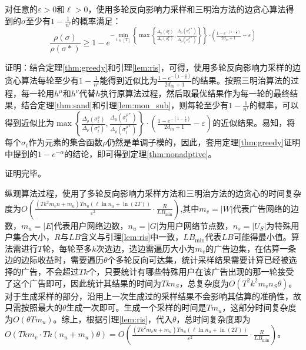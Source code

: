 \begin{theorem}
\label{thm:nonadptive}
对任意的$\varepsilon>0$和$\ell > 0$，使用多轮反向影响力采样和三明治方法的边贪心算法得到的$\sigma$至少有$1-\frac{1}{n^{\ell}}$的概率满足：
\begin{equation}
\frac{\rho(\sigma)}{\rho(\sigma*)} \ge 1-e^{-\min_{t \in [T]}\left\{\max\left\{\frac{\Delta_\rho(\sigma_t^\nu)}{\Delta_\nu(\sigma_t^\nu)},\frac{\Delta_\mu(\sigma_t^{\rho*})}{\Delta_\rho(\sigma_t^{\rho*})} \right\}\right\}\cdot\left(\frac{1-e^{-(1-\frac{1}{k})}}{2d_{in}+1}-\varepsilon\right)}
\end{equation}
\end{theorem}

\noindent 证明：结合定理\ref{thm:greedy}和引理\ref{lem:ris}，可得，使用多轮反向影响力采样的边贪心算法每轮至少有$1-\frac{1}{n^{\ell}}$能得到近似比为$\frac{1-e^{-(1-\frac{1}{k})}}{2d_{in}+1}$的结果。按照三明治算法的过程，每一轮用$h^\mu$和$h^\nu$代替$h$执行原算法过程，然后取最优结果作为每一轮的最终结果，结合定理\ref{thm:sand}和引理\ref{lem:mon_sub}，则每轮至少有$1-\frac{1}{n^{\ell}}$的概率，可以得到近似比为$\max\left\{\frac{\Delta_\rho(\sigma_t^\nu)}{\Delta_\nu(\sigma_t^\nu)},\frac{\Delta_\mu(\sigma_t^{\rho*})}{\Delta_\rho(\sigma_t^{\rho*})} \right\}\cdot\left(\frac{1-e^{-(1-\frac{1}{k})}}{2d_{in}+1}-\varepsilon\right)$的近似结果。易知，将每个$\sigma_t$作为元素的集合函数$\rho$仍然是单调子模的，因此，套用定理\ref{thm:greedy}证明中提到的$1-e^{-\alpha}$的结论，即可得到定理\ref{thm:nonadptive}。

\noindent 证明完毕。

纵观算法过程，使用了多轮反向影响力采样方法和三明治方法的边贪心的时间复杂度为$O\left(\frac{(Tk^2 m_v n + m_u)Tn_u(\ell \ln n_u + \ln (2T))}{\varepsilon^2}\cdot\frac{R}{LB_{\min}}\right)$,其中$m_v=|W|$代表广告网络的边数，$m_u=|E|$代表用户网络边数，$n_u=|G|$为用户网络节点数，$n_s=|U_S|$为特殊用户集合大小，$R$与$LB$含义与引理\ref{lem:ris}中一致，$LB_{\min}$代表$LB$可能得最小值。算法需进行$T$轮，每轮至多$k$次选边，选边需遍历大小为$m_v$的广告边集，在估算一条边的边际收益时，需要遍历$\theta$个多轮反向可达集，统计采样结果需要计算已经被选择的广告，不会超过$Tk$个，只要统计有哪些特殊用户在该广告出现的那一轮接受了这个广告即可，因此统计其结果的时间为$Tkn_S$，总复杂度为$O(T^2k^2m_vn_S\theta)$。对于生成采样的部分，沿用上一次生成过的采样结果不会影响其估算的准确性，故只需按照最大的$\theta$生成一次即可。生成一个采样的时间是$Tm_u$，这部分时间复杂度为$O(\theta Tm_u)$。综上，根据引理\ref{lem:ris}，代入$\theta$，总时间复杂度即为$O(Tkm_v\cdot Tk(n_u+m_u)\theta) = O\left(\frac{(Tk^2 m_v n + m_u)Tn_u(\ell \ln n_u + \ln (2T))}{\varepsilon^2}\cdot\frac{R}{LB_{\min}}\right)$。


